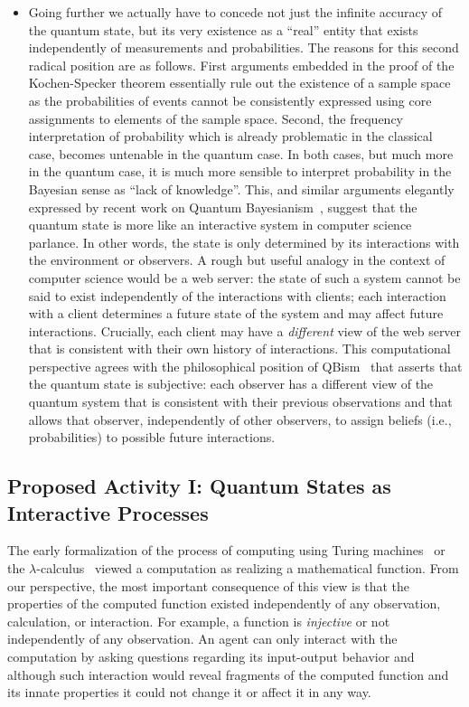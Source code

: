\documentclass{article}
\theoremstyle{remark}
\begin{document}
\begin{itemize}
\item Going further we actually have to concede not just the infinite
  accuracy of the quantum state, but its very existence as a ``real''
  entity that exists independently of measurements and
  probabilities. The reasons for this second radical position are as
  follows. First arguments embedded in the proof of the Kochen-Specker
  theorem essentially rule out the existence of a sample space as the
  probabilities of events cannot be consistently expressed using core
  assignments to elements of the sample space. Second, the frequency
  interpretation of probability which is already problematic in the
  classical case, becomes untenable in the quantum case. In both
  cases, but much more in the quantum case, it is much more sensible
  to interpret probability in the Bayesian sense as ``lack of
  knowledge''. This, and similar arguments elegantly expressed by
  recent work on Quantum Bayesianism~\cite{Fuchs2010,VonBaeyer2016,Fuchs2012},
  suggest that the quantum state is more like an interactive system in
  computer science parlance. In other words, the state is only
  determined by its interactions with the environment or observers. A
  rough but useful analogy in the context of computer science would be
  a web server: the state of such a system cannot be said to exist
  independently of the interactions with clients; each interaction
  with a client determines a future state of the system and may affect
  future interactions. Crucially, each client may have a
  \emph{different} view of the web server that is consistent with
  their own history of interactions. This computational perspective
  agrees with the philosophical position of QBism~\cite{VonBaeyer2016}
  that asserts that the quantum state is subjective: each observer has
  a different view of the quantum system that is consistent with their
  previous observations and that allows that observer, independently
  of other observers, to assign beliefs (i.e., probabilities) to
  possible future interactions.

\end{itemize} 

\subsection{Proposed Activity I: Quantum States as Interactive Processes} 

The early formalization of the process of computing using Turing
machines~\cite{Turing_1937,blum2012complexity} or the
$\lambda$-calculus~\cite{Church1932,Barendregt:Lambda} viewed a computation as
realizing a mathematical function. From our perspective, the most
important consequence of this view is that the properties of the
computed function existed independently of any observation,
calculation, or interaction. For example, a function is
\emph{injective} or not independently of any observation. An agent can
only interact with the computation by asking questions regarding its
input-output behavior and although such interaction would reveal
fragments of the computed function and its innate properties it could
not change it or affect it in any way.
\end{document}
